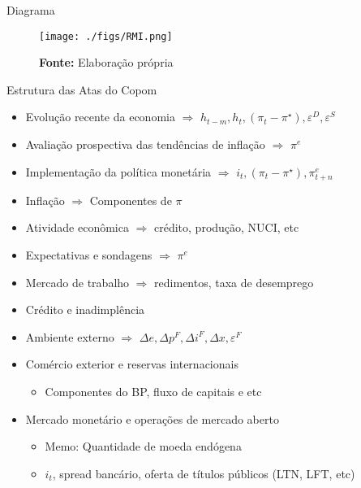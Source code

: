 \documentclass[presentation]{beamer}
\begin{document}
\begin{frame}[label={sec:org4404082}]{Diagrama}
\begin{figure}[htb]
\centering
\caption{Representação do Modelo do regime de Metas para inflação} 
\texttt{[image: ./figs/RMI.png]}
\label{fig:ibcbr}
\caption*{\textbf{Fonte:} Elaboração própria}
\end{figure}
\end{frame}
\begin{frame}[label={sec:orgebcd18c}]{Estrutura das Atas do Copom}
\begin{itemize}
\item Evolução recente da economia \(\Rightarrow\) \(h_{t-m}, h_{t}, (\pi_{t} - \pi^{\star}), \varepsilon^{D}, \varepsilon^{S}\)
\item Avaliação prospectiva das tendências de inflação \(\Rightarrow\) \(\pi^{e}\)
\item Implementação da política monetária \(\Rightarrow\) \(i_{t}, (\pi_{t} - \pi^{\star}), \pi^{e}_{t+n}\)
\item Inflação \(\Rightarrow\) Componentes de \(\pi\)
\item Atividade econômica \(\Rightarrow\) crédito, produção, NUCI, etc
\item Expectativas e sondagens \(\Rightarrow\) \(\pi^{e}\)
\item Mercado de trabalho \(\Rightarrow\) redimentos, taxa de desemprego
\item Crédito e inadimplência
\item Ambiente externo \(\Rightarrow\) \(\Delta e, \Delta p^{F}, \Delta i^{F}, \Delta x, \varepsilon^{F}\)
\item Comércio exterior e reservas internacionais
\begin{itemize}
\item Componentes do BP, fluxo de capitais e etc
\end{itemize}
\item Mercado monetário e operações de mercado aberto
\begin{itemize}
\item \alert{Memo:} Quantidade de moeda endógena
\item \(i_{t}\), spread bancário, oferta de títulos públicos (LTN, LFT, etc)
\end{itemize}
\end{itemize}
\end{frame}
\end{document}
